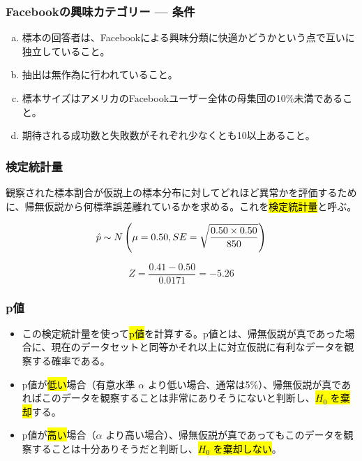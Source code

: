 
\begin{frame}
\frametitle{Facebookの興味カテゴリー — 条件}


\begin{enumerate}[(a)]
\item 標本の回答者は、Facebookによる興味分類に快適かどうかという点で互いに独立していること。
\item 抽出は無作為に行われていること。
\item 標本サイズはアメリカのFacebookユーザー全体の母集団の10\%未満であること。
\item 期待される成功数と失敗数がそれぞれ少なくとも10以上あること。
\end{enumerate}

\end{frame}


\begin{frame}
\frametitle{検定統計量}

観察された標本割合が仮説上の標本分布に対してどれほど異常かを評価するために、帰無仮説から何標準誤差離れているかを求める。これを\hl{検定統計量}と呼ぶ。

\[ \hat{p} \sim N \left(  \mu = 0.50, SE = \sqrt{\frac{0.50 \times 0.50}{850} }   \right) \]

\[ Z = \frac{0.41 - 0.50}{0.0171} = -5.26 \]



\end{frame}


\begin{frame}
\frametitle{p値}

\begin{itemize}

\item この検定統計量を使って\hl{p値}を計算する。p値とは、帰無仮説が真であった場合に、現在のデータセットと同等かそれ以上に対立仮説に有利なデータを観察する確率である。

\item p値が\hl{低い}場合（有意水準 $\alpha$ より低い場合、通常は5\%）、帰無仮説が真であればこのデータを観察することは非常にありそうにないと判断し、\hl{$H_0$ を棄却}する。

\item p値が\hl{高い}場合（$\alpha$ より高い場合）、帰無仮説が真であってもこのデータを観察することは十分ありそうだと判断し、\hl{$H_0$ を棄却しない}。

\end{itemize}

\end{frame}

